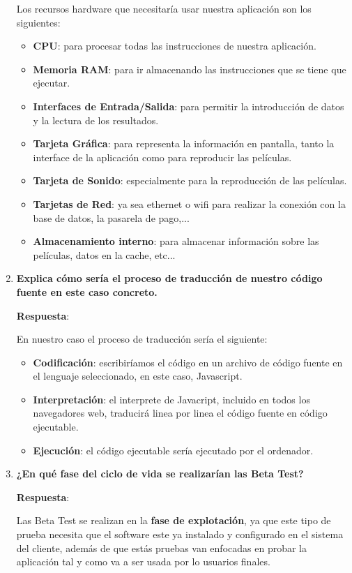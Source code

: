 \begin{enumerate}
    Los recursos hardware que necesitaría usar nuestra aplicación son los siguientes:
    \begin{itemize}
        \item \textbf{CPU}: para procesar todas las instrucciones de nuestra aplicación.
        \item \textbf{Memoria RAM}: para ir almacenando las instrucciones que se tiene que ejecutar.
        \item \textbf{Interfaces de Entrada/Salida}: para permitir la introducción de datos y la lectura de los resultados.
        \item \textbf{Tarjeta Gráfica}: para representa la información en pantalla, tanto la interface de la aplicación como para reproducir las películas.
        \item \textbf{Tarjeta de Sonido}: especialmente para la reproducción de las películas.
        \item \textbf{Tarjetas de Red}: ya sea ethernet o wifi para realizar la conexión con la base de datos, la pasarela de pago,...
        \item \textbf{Almacenamiento interno}: para almacenar información sobre las películas, datos en la cache, etc...
    \end{itemize}

     \item \textbf{Explica cómo sería el proceso de traducción de nuestro código fuente en este caso concreto.}

     \textbf{Respuesta}:

     En nuestro caso el proceso de traducción sería el siguiente:
     \begin{itemize}
         \item \textbf{Codificación}: escribiríamos el código en un archivo de código fuente en el lenguaje seleccionado, en este caso, Javascript.
         \item \textbf{Interpretación}: el interprete de Javacript, incluido en todos los navegadores web, traducirá linea por linea el código fuente en código ejecutable.
         \item \textbf{Ejecución}: el código ejecutable sería ejecutado por el ordenador.
     \end{itemize}

     \item \textbf{¿En qué fase del ciclo de vida se realizarían las Beta Test?}

     \textbf{Respuesta}:

     Las Beta Test se realizan en la \textbf{fase de explotación}, ya que este tipo de prueba necesita que el software este ya instalado y configurado en el sistema del cliente, además de que estás pruebas van enfocadas en probar la aplicación tal y como va a ser usada por lo usuarios finales.


\end{enumerate}
